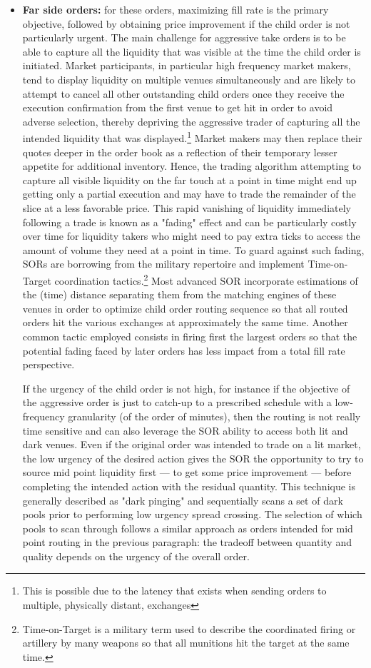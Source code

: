 \begin{itemize}
\item \textbf{Far side orders:} for these orders, maximizing fill rate is the primary objective, followed by obtaining price improvement if the child order is not particularly urgent. The main challenge for aggressive take orders is to be able to capture all the liquidity that was visible at the time the child order is initiated. Market participants, in particular high frequency market makers, tend to display liquidity on multiple venues simultaneously and are likely to attempt to cancel all other outstanding child orders once they receive the execution confirmation from the first venue to get hit in order to avoid adverse selection, thereby depriving the aggressive trader of capturing all the intended liquidity that was displayed.\footnote{This is possible due to the latency that exists when sending orders to multiple, physically distant, exchanges} Market makers may then replace their quotes deeper in the order book as a reflection of their temporary lesser appetite for additional inventory. Hence, the trading algorithm attempting to capture all visible liquidity on the far touch at a point in time might end up getting only a partial execution and may have to trade the remainder of the slice at a less favorable price. This rapid vanishing of liquidity immediately following a trade is known as a "fading" effect and can be particularly costly over time for liquidity takers who might need to pay extra ticks to access the amount of volume they need at a point in time. To guard against such fading, SORs are borrowing from the military repertoire and implement Time-on-Target coordination tactics.\footnote{Time-on-Target is a military term used to describe the coordinated firing or artillery by many weapons so that all munitions hit the target at the same time.} Most advanced SOR incorporate estimations of the (time) distance separating them from the matching engines of these venues in order to optimize child order routing sequence so that all routed orders hit the various exchanges at approximately the same time. Another common tactic employed consists in firing first the largest orders so that the potential fading faced by later orders has less impact from a total fill rate perspective. 

If the urgency of the child order is not high, for instance if the objective of the aggressive order is just to catch-up to a prescribed schedule with a low-frequency granularity (of the order of minutes), then the routing is not really time sensitive and can also leverage the SOR ability to access both lit and dark venues. Even if the original order was intended to trade on a lit market, the low urgency of the desired action gives the SOR the opportunity to try to source mid point liquidity first --- to get some price improvement --- before completing the intended action with the residual quantity. This technique is generally described as "dark pinging" and sequentially scans a set of dark pools prior to performing low urgency spread crossing. The selection of which pools to scan through follows a similar approach as orders intended for mid point routing in the previous paragraph: the tradeoff between quantity and quality depends on the urgency of the overall order.
\end{itemize}


